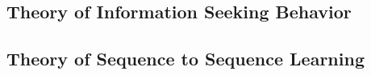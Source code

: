 \subsection{Theory of Information Seeking Behavior}
\label{sec:info-seek}

\subsection{Theory of Sequence to Sequence Learning}


\cleardoublepage